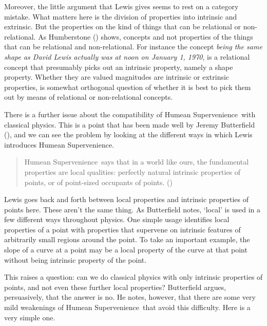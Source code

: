 \documentclass[
  10pt,
  letterpaper,
  DIV=11,
  numbers=noendperiod,
  twoside]{scrartcl}
\begin{document}
Moreover, the little argument that Lewis gives seems to rest on a
category mistake. What matters here is the division of properties into
intrinsic and extrinsic. But the properties on the kind of things that
can be relational or non-relational. As Humberstone
() shows, concepts and not
properties of the things that can be relational and non-relational. For
instance the concept \emph{being the same shape as David Lewis actually
was at noon on January 1, 1970}, is a relational concept that presumably
picks out an intrinsic property, namely a shape property. Whether they
are valued magnitudes are intrinsic or extrinsic properties, is somewhat
orthogonal question of whether it is best to pick them out by means of
relational or non-relational concepts.

There is a further issue about the compatibility of Humean
Supervenience~with classical physics. This is a point that has been made
well by Jeremy Butterfield (), and
we can see the problem by looking at the different ways in which Lewis
introduces Humean Supervenience.

\begin{quote}
Humean Supervenience~says that in a world like ours, the fundamental
properties are local qualities: perfectly natural intrinsic properties
of points, or of point-sized occupants of points.
()
\end{quote}

Lewis goes back and forth between local properties and intrinsic
properties of points here. These aren't the same thing. As Butterfield
notes, `local' is used in a few different ways throughout physics. One
simple usage identifies local properties of a point with properties that
supervene on intrinsic features of arbitrarily small regions around the
point. To take an important example, the slope of a curve at a point may
be a local property of the curve at that point without being intrinsic
property of the point.

This raises a question: can we do classical physics with only intrinsic
properties of points, and not even these further local properties?
Butterfield argues, persuasively, that the answer is no. He notes,
however, that there are some very mild weakenings of Humean
Supervenience~that avoid this difficulty. Here is a very simple one.
\end{document}
